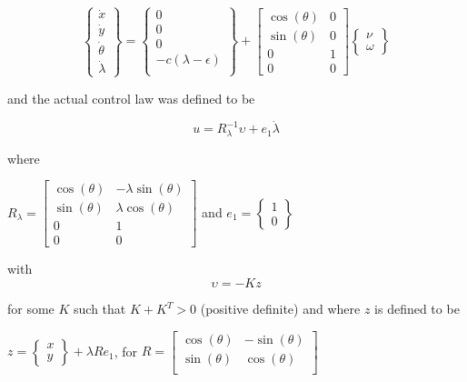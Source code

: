 \documentclass[10pt,a4paper]{article}
\begin{document}
\[ \begin{Bmatrix}
   \dot{x} \\
   \dot{y} \\
   \dot{\theta} \\
   \dot{\lambda}
   \end{Bmatrix}
   =
   \begin{Bmatrix}
   0 \\
   0 \\
   0 \\
   -c(\lambda - \epsilon)\\
   \end{Bmatrix}   
   +
  \begin{bmatrix}
  \cos (\theta) & 0 \\
  \sin (\theta) & 0 \\
  0 & 1 \\
  0 & 0 
  \end{bmatrix}  
  \begin{Bmatrix}
  \nu \\
  \omega
  \end{Bmatrix}
\]

and the actual control law was defined to be

\[ u = R^{-1}_{\lambda} \upsilon + e_{1}\dot{\lambda} \]

where
\begin{center}
$ R_{\lambda} = 
  \begin{bmatrix}
  \cos (\theta) & -\lambda \sin (\theta) \\
  \sin (\theta) & \lambda \cos (\theta) \\
  0 & 1 \\
  0 & 0 
  \end{bmatrix}$ 
and
$e_{1} = 
\begin{Bmatrix}
1 \\
0
\end{Bmatrix}$
\end{center}

with 
\[ \upsilon = -Kz \]

for some $K$ such that $K + K^{T} > 0$ (positive definite) and where $z$ is defined to be
\begin{center}
$z = 
\begin{Bmatrix}
x \\
y
\end{Bmatrix}
+
\lambda Re_{1}$, for 
$ R = 
\begin{bmatrix}
  \cos (\theta) & -\sin (\theta) \\
  \sin (\theta) & \cos (\theta) \\
\end{bmatrix}$
\end{center} 
\end{document}
